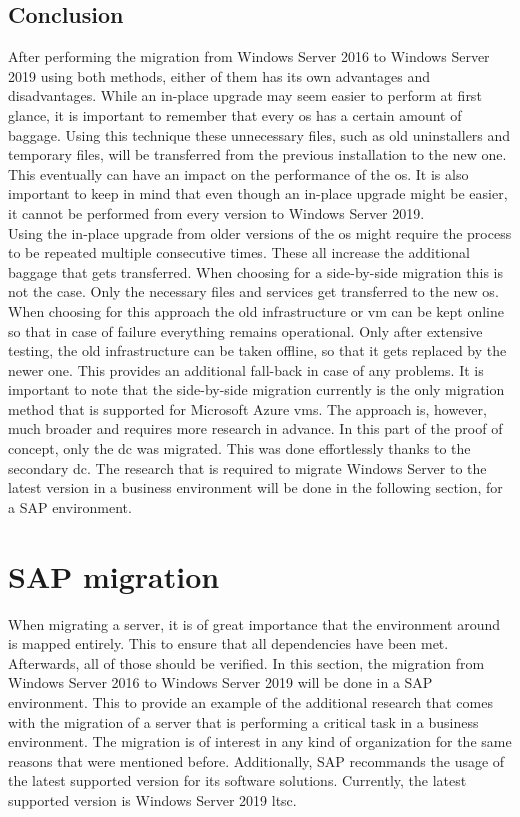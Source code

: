 \subsection{Conclusion}
After performing the migration from Windows Server 2016 to Windows Server 2019 using both methods, either of them has its own advantages and disadvantages. 
While an in-place upgrade may seem easier to perform at first glance, it is important to remember that every \acrshort{os} has a certain amount of baggage.
Using this technique these unnecessary files, such as old uninstallers and temporary files, will be transferred from the previous installation to the new one. 
This eventually can have an impact on the performance of the \acrshort{os}. 
It is also important to keep in mind that even though an in-place upgrade might be easier, it cannot be performed from every version to Windows Server 2019.
\\
Using the in-place upgrade from older versions of the \acrshort{os} might require the process to be repeated multiple consecutive times. 
These all increase the additional baggage that gets transferred. 
When choosing for a side-by-side migration this is not the case. 
Only the necessary files and services get transferred to the new \acrshort{os}. 
When choosing for this approach the old infrastructure or \acrshort{vm} can be kept online so that in case of failure everything remains operational. 
Only after extensive testing, the old infrastructure can be taken offline, so that it gets replaced by the newer one. 
This provides an additional fall-back in case of any problems. 
It is important to note that the side-by-side migration currently is the only migration method that is supported for Microsoft Azure \acrshort{vm}s. 
The approach is, however, much broader and requires more research in advance. 
In this part of the proof of concept, only the \acrshort{dc} was migrated. 
This was done effortlessly thanks to the secondary \acrshort{dc}. 
The research that is required to migrate Windows Server to the latest version in a business environment will be done in the following section, for a SAP environment. 
\clearpage

\section{SAP migration}
\label{sec:SAP}
When migrating a server, it is of great importance that the environment around is mapped entirely. 
This to ensure that all dependencies have been met. 
Afterwards, all of those should be verified. 
In this section, the migration from Windows Server 2016 to Windows Server 2019 will be done in a SAP environment. 
This to provide an example of the additional research that comes with the migration of a server that is performing a critical task in a business environment. 
The migration is of interest in any kind of organization for the same reasons that were mentioned before. 
Additionally, SAP recommands the usage of the latest supported version for its software solutions. 
Currently, the latest supported version is Windows Server 2019 \acrshort{ltsc}.


